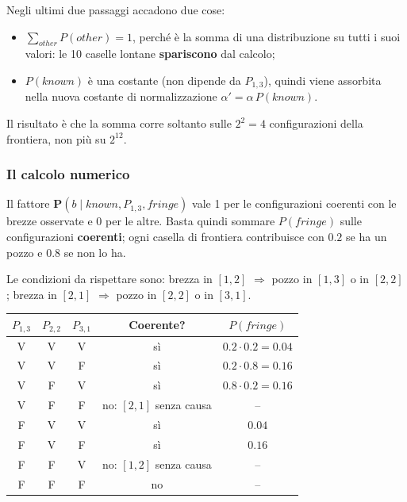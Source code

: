 \documentclass[11pt, a4paper]{article}
\newcommand{\intest}[1]{\textcolor{verde}{\sffamily\bfseries #1}}
\newcommand{\vero}{\textcolor{verde}{V}}
\newcommand{\falso}{\textcolor{tenue}{F}}
\newcommand{\nota}[1]{\textcolor{tenue}{#1}}
\newcommand{\Pv}{\mathbf{P}}               %
\newcommand{\known}{\mathit{known}}
\newcommand{\fringe}{\mathit{fringe}}
\newcommand{\other}{\mathit{other}}
\begin{document}
Negli ultimi due passaggi accadono due cose:
\begin{itemize}
  \item $\sum_{\other} P(\other) = 1$, perché è la somma di una distribuzione su tutti i suoi valori: le 10 caselle lontane \textbf{spariscono} dal calcolo;
  \item $P(\known)$ è una costante (non dipende da $P_{1,3}$), quindi viene assorbita nella nuova costante di normalizzazione $\alpha' = \alpha\,P(\known)$.
\end{itemize}

Il risultato è che la somma corre soltanto sulle $2^2 = 4$ configurazioni della frontiera, non più su $2^{12}$.

\subsubsection*{Il calcolo numerico}

Il fattore $\Pv(b \mid \known, P_{1,3}, \fringe)$ vale 1 per le configurazioni coerenti con le brezze osservate e 0 per le altre. Basta quindi sommare $P(\fringe)$ sulle configurazioni \textbf{coerenti}; ogni casella di frontiera contribuisce con $0.2$ se ha un pozzo e $0.8$ se non lo ha.

Le condizioni da rispettare sono: brezza in $[1,2]$ $\Rightarrow$ pozzo in $[1,3]$ o in $[2,2]$; brezza in $[2,1]$ $\Rightarrow$ pozzo in $[2,2]$ o in $[3,1]$.

\begin{center}
  \renewcommand{\arraystretch}{1.3}
  \begin{tabular}{c c c c c}
    \toprule
    \intest{$P_{1,3}$} & \intest{$P_{2,2}$} & \intest{$P_{3,1}$} & \intest{Coerente?} & \intest{$P(\fringe)$} \\
    \midrule
    \vero & \vero & \vero & sì & $0.2 \cdot 0.2 = 0.04$ \\
    \vero & \vero & \falso & sì & $0.2 \cdot 0.8 = 0.16$ \\
    \vero & \falso & \vero & sì & $0.8 \cdot 0.2 = 0.16$ \\
    \vero & \falso & \falso & \nota{no: $[2,1]$ senza causa} & -- \\
    \midrule
    \falso & \vero & \vero & sì & $0.04$ \\
    \falso & \vero & \falso & sì & $0.16$ \\
    \falso & \falso & \vero & \nota{no: $[1,2]$ senza causa} & -- \\
    \falso & \falso & \falso & \nota{no} & -- \\
    \bottomrule
  \end{tabular}
\end{center}
\end{document}
